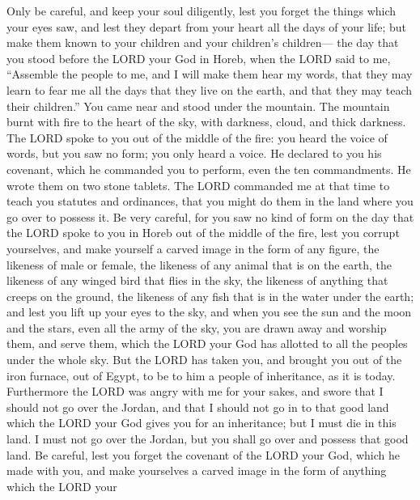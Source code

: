  Only be careful, and keep your soul diligently, lest you
forget the things which your eyes saw, and lest they depart from your
heart all the days of your life; but make them known to your children
and your children's children---  the day that you stood
before the LORD your God in Horeb, when the LORD said to me, ``Assemble
the people to me, and I will make them hear my words, that they may
learn to fear me all the days that they live on the earth, and that they
may teach their children.''  You came near and stood
under the mountain. The mountain burnt with fire to the heart of the
sky, with darkness, cloud, and thick darkness.  The LORD
spoke to you out of the middle of the fire: you heard the voice of
words, but you saw no form; you only heard a voice.  He
declared to you his covenant, which he commanded you to perform, even
the ten commandments. He wrote them on two stone tablets.
 The LORD commanded me at that time to teach you statutes
and ordinances, that you might do them in the land where you go over to
possess it.  Be very careful, for you saw no kind of form
on the day that the LORD spoke to you in Horeb out of the middle of the
fire,  lest you corrupt yourselves, and make yourself a
carved image in the form of any figure, the likeness of male or female,
 the likeness of any animal that is on the earth, the
likeness of any winged bird that flies in the sky,  the
likeness of anything that creeps on the ground, the likeness of any fish
that is in the water under the earth;  and lest you lift
up your eyes to the sky, and when you see the sun and the moon and the
stars, even all the army of the sky, you are drawn away and worship
them, and serve them, which the LORD your God has allotted to all the
peoples under the whole sky.  But the LORD has taken you,
and brought you out of the iron furnace, out of Egypt, to be to him a
people of inheritance, as it is today.  Furthermore the
LORD was angry with me for your sakes, and swore that I should not go
over the Jordan, and that I should not go in to that good land which the
LORD your God gives you for an inheritance;  but I must
die in this land. I must not go over the Jordan, but you shall go over
and possess that good land.  Be careful, lest you forget
the covenant of the LORD your God, which he made with you, and make
yourselves a carved image in the form of anything which the LORD your
